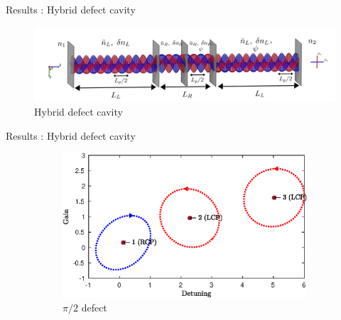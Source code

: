 \documentclass[aspectratio=169]{beamer}
\begin{document}
\begin{frame}{Results : Hybrid defect cavity}
	\begin{figure}
		\centering
		\includegraphics[width=\linewidth]{images/hybrid_defect.png}
		\caption{Hybrid defect cavity}
	\end{figure}
\end{frame}
\begin{frame}{Results : Hybrid defect cavity}
	\begin{figure}
		\begin{subfigure}{0.24\linewidth}
			\includegraphics[width=\linewidth]{plots/hybrid_defect/pi_2/modes_found}
			\caption{$\pi/2$ defect}
		\end{subfigure}
		\begin{subfigure}{0.24\linewidth}

\end{subfigure}
\end{figure}
\end{frame}
\end{document}
